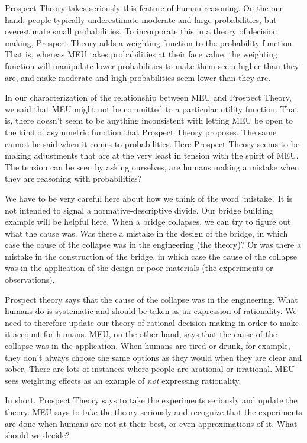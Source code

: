 \documentclass[]{tufte-book}
\begin{document}
Prospect Theory takes seriously this feature of human reasoning. On the one hand, people typically underestimate moderate and large probabilities, but overestimate small probabilities. To incorporate this in a theory of decision making, Prospect Theory adds a weighting function to the probability function. That is, whereas MEU takes probabilities at their face value, the weighting function will manipulate lower probabilities to make them seem higher than they are, and make moderate and high probabilities seem lower than they are.

In our characterization of the relationship between MEU and Prospect Theory, we said that MEU might not be committed to a particular utility function. That is, there doesn't seem to be anything inconsistent with letting MEU be open to the kind of asymmetric function that Prospect Theory proposes. The same cannot be said when it comes to probabilities. Here Prospect Theory seems to be making adjustments that are at the very least in tension with the spirit of MEU. The tension can be seen by asking ourselves, are humans making a mistake when they are reasoning with probabilities?

We have to be very careful here about how we think of the word `mistake'. It is not intended to signal a normative-descriptive divide. Our bridge building example will be helpful here. When a bridge collapses, we can try to figure out what the cause was. Was there a mistake in the design of the bridge, in which case the cause of the collapse was in the engineering (the theory)? Or was there a mistake in the construction of the bridge, in which case the cause of the collapse was in the application of the design or poor materials (the experiments or observations).

Prospect theory says that the cause of the collapse was in the engineering. What humans do is systematic and should be taken as an expression of rationality. We need to therefore update our theory of rational decision making in order to make it account for humans. MEU, on the other hand, says that the cause of the collapse was in the application. When humans are tired or drunk, for example, they don't always choose the same options as they would when they are clear and sober. There are lots of instances where people are arational or irrational. MEU sees weighting effects as an example of \emph{not} expressing rationality.

In short, Prospect Theory says to take the experiments seriously and update the theory. MEU says to take the theory seriously and recognize that the experiments are done when humans are not at their best, or even approximations of it. What should we decide?
\end{document}
